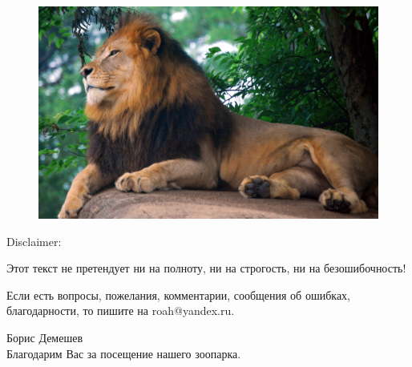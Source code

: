 \documentclass[10pt,a4paper]{article}
\begin{document}
\newpage
\pagecolor{YellowOrange}
\begin{figure}[h]
\centering
\includegraphics[width = 12cm]{king.jpg}
\end{figure}
\par Disclaimer:
\par Этот текст не претендует ни на полноту, ни на строгость, ни на безошибочность! 
\par Если есть вопросы, пожелания, комментарии, сообщения об ошибках, благодарности, то пишите на roah@yandex.ru. 
\par Борис Демешев \\

Благодарим Вас за посещение нашего зоопарка.
\end{document}
